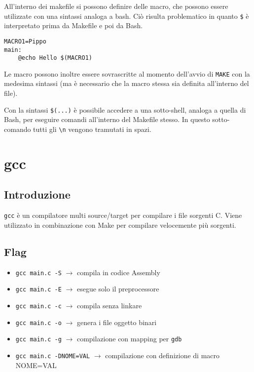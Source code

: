 \documentclass[11pt]{article}
\begin{document}
All'interno dei makefile si possono definire delle macro, che possono essere utilizzate con una sintassi analoga a bash. Ciò risulta problematico in quanto \verb|$| è interpretato prima da Makefile e poi da Bash.

\begin{verbatim}
MACRO1=Pippo
main:
    @echo Hello $(MACRO1)
\end{verbatim}

Le macro possono inoltre essere sovrascritte al momento dell'avvio di \verb|MAKE| con la medesima sintassi (ma è necessario che la macro stessa sia definita all'interno del file).

Con la sintassi \verb|$(...)| è possibile accedere a una sotto-shell, analoga a quella di Bash, per eseguire comandi all'interno del Makefile stesso. In questo sotto-comando tutti gli \verb|\n| vengono tramutati in spazi.

\section{gcc}

\subsection{Introduzione}

\verb|gcc| è un compilatore multi source/target per compilare i file sorgenti C. Viene utilizzato in combinazione con Make per compilare velocemente più sorgenti.

\subsection{Flag}
\begin{itemize}
    \item\verb|gcc main.c -S| $\rightarrow$ compila in codice Assembly
    \item\verb|gcc main.c -E| $\rightarrow$ esegue solo il preprocessore
    \item\verb|gcc main.c -c| $\rightarrow$ compila senza linkare
    \item\verb|gcc main.c -o| $\rightarrow$ genera i file oggetto binari
    \item\verb|gcc main.c -g| $\rightarrow$ compilazione con mapping per \verb|gdb|
    \item\verb|gcc main.c -DNOME=VAL| $\rightarrow$ compilazione con definizione di macro NOME=VAL
\end{itemize}
\end{document}
